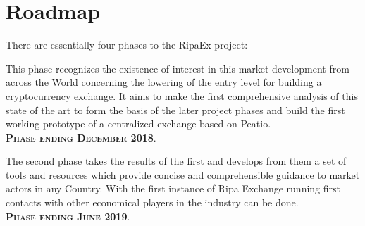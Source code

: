 \documentclass[11pt,fleqn,oneside]{book} %
\begin{document}
\pagebreak
\section{Roadmap}
There are essentially four phases to the RipaEx project:\\

\begin{center}
\begin{tcolorbox}[roadmapBox,
	title=\textbf{\textsc{Funding the project: XPX PreSale and RIPA TEC (WP2)}}]

	This phase recognizes the existence of interest in this market development
	from across the World concerning the lowering of the entry level for building a cryptocurrency exchange.
	It aims to make the first comprehensive analysis of this state of the art to form the basis of the later project phases and
	build the first working prototype of a centralized exchange based on Peatio.\\
	\vspace{1cm}
	\centering\textbf{\textsc{Phase ending December 2018}}.
\end{tcolorbox}

\resizebox{0.05\textwidth}{26pt}{$\Downarrow$}

\begin{tcolorbox}[roadmapBox,
	title=\textbf{\textsc{First exchange opening and development of tools and resources (WP3)}}]

	The second phase takes the results of the first 
	and develops from them a set of tools and resources which provide concise and comprehensible guidance to market actors in any
	Country. With the first instance of Ripa Exchange running first contacts with other economical players in the industry can be
	done.\\
	\vspace{1cm}
	\centering\textbf{\textsc{Phase ending June 2019}}.
\end{tcolorbox}

\resizebox{0.05\textwidth}{26pt}{$\Downarrow$}

\begin{tcolorbox}[roadmapBox,
	title=\textbf{\textsc{Dissemination (WP 7/8) and Project Coordination (WP1)}}]


\end{tcolorbox}
\end{center}
\end{document}
